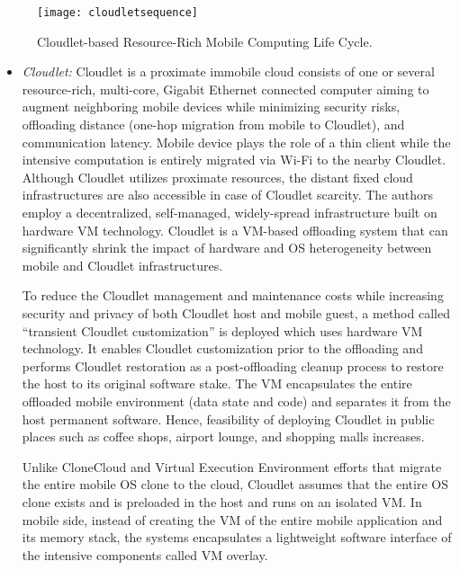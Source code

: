 \documentclass[publish]{IEEEtran}
\begin{document}
\begin{figure*} [t]
\centering
\texttt{[image: cloudletsequence]}
\caption{Cloudlet-based Resource-Rich Mobile Computing Life Cycle.} \label{sequencediagramcloudlet}
\end{figure*}

\begin{itemize}
\item \textit{Cloudlet:}
Cloudlet \cite{Satyanarayanan2009} is a proximate immobile cloud consists of one or several resource-rich, multi-core, Gigabit Ethernet connected computer aiming to augment neighboring mobile devices while minimizing security risks, offloading distance (one-hop migration from mobile to Cloudlet), and communication latency. Mobile device plays the role of a thin client while the intensive computation is entirely migrated via Wi-Fi to the nearby Cloudlet. Although Cloudlet utilizes proximate resources, the distant fixed cloud infrastructures are also accessible in case of Cloudlet scarcity. The authors employ a decentralized, self-managed, widely-spread infrastructure built on hardware VM technology. Cloudlet is a VM-based offloading system that can significantly shrink the impact of hardware and OS heterogeneity between mobile and Cloudlet infrastructures. 

To reduce the Cloudlet management and maintenance costs while increasing security and privacy of both Cloudlet host and mobile guest, a method called ``transient Cloudlet customization'' is deployed which uses hardware VM technology. It enables Cloudlet customization prior to the offloading and performs Cloudlet restoration as a post-offloading cleanup process to restore the host to its original software stake. The VM encapsulates the entire offloaded mobile environment (data state and code) and separates it from the host permanent software. Hence, feasibility of deploying Cloudlet in public places such as coffee shops, airport lounge, and shopping malls increases. 

Unlike CloneCloud and Virtual Execution Environment efforts that migrate the entire mobile OS clone to the cloud, Cloudlet assumes that the entire OS clone exists and is preloaded in the host and runs on an isolated VM. In mobile side, instead of creating the VM of the entire mobile application and its memory stack, the systems encapsulates a lightweight software interface of the intensive components called VM overlay. 


\end{itemize}
\end{document}
